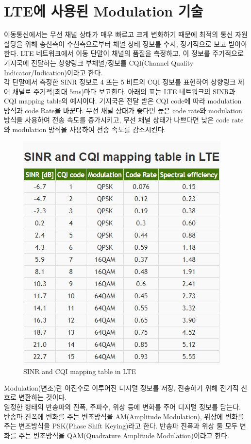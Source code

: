 \section{LTE에 사용된 Modulation 기술}
이동통신에서는 무선 채널 상태가 매우 빠르고 크게 변화하기 때문에 최적의 통신 자원 할당을 위해 송신측이 수신측으로부터 채널 상태 정보를 수시, 정기적으로 보고 받아야 한다. LTE 네트워크에서 이동 단말이 채널의 품질을 측정하고, 이 정보를 주기적으로 기지국에 전달하는 상향링크 부채널/정보를 CQI(Channel Quality Indicator/Indication)이라고 한다. \\
각 단말에서 측정한 SINR 정보로 4 또는 5 비트의 CQI 정보를 표현하여 상향링크 제어 채널로 주기적(최대 5ms)마다 보고한다. 아래의 표는 LTE 네트워크의 SINR과 CQI mapping table의 예시이다. 기지국은 전달 받은 CQI code에 따라 modulation 방식과 code Rate을 바꾼다. 무선 채널 상태가 좋다면 높은 code rate와 modulation 방식을 사용하여 전송 속도를 증가시키고, 무선 채널 상태가 나쁘다면 낮은 code rate와 modulation 방식을 사용하여 전송 속도를 감소시킨다. \\
\vspace{-4mm}  
\begin{figure}[!h]\centering
	\includegraphics[width=.6\textwidth]{image/week11/2-1.png}
	\caption{\small SINR and CQI mapping table in LTE}
	\vspace{-10pt}
\end{figure}
Modulation(변조)란 이진수로 이루어진 디지털 정보를 저장, 전송하기 위해 전기적 신호로 변환하는 것이다. \\
일정한 형태의 반송파의 진폭, 주파수, 위상 등에 변화를 주어 디지털 정보를 담는다. 반송파 진폭에 변화를 주는 변조방식을 AM(Amplitude Modulation), 위상에 변화를 주는 변조방식을 PSK(Phase Shift Keying)라고 한다. 반송파 진폭과 위상 둘 모두 변화를 주는 변조방식을 QAM(Quadrature Amplitude Modulation)이라고 한다. \\
